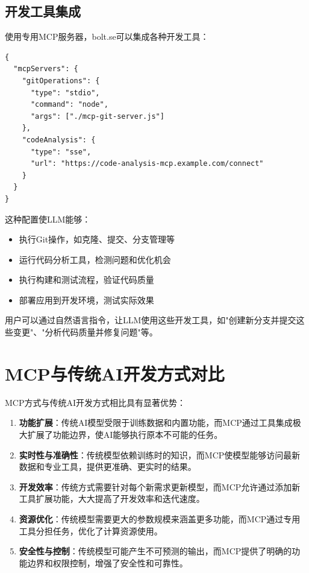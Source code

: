 \subsection{开发工具集成}

使用专用MCP服务器，bolt.se可以集成各种开发工具：

\begin{verbatim}
{
  "mcpServers": {
    "gitOperations": {
      "type": "stdio",
      "command": "node",
      "args": ["./mcp-git-server.js"]
    },
    "codeAnalysis": {
      "type": "sse",
      "url": "https://code-analysis-mcp.example.com/connect"
    }
  }
}
\end{verbatim}

这种配置使LLM能够：
\begin{itemize}
  \item 执行Git操作，如克隆、提交、分支管理等
  \item 运行代码分析工具，检测问题和优化机会
  \item 执行构建和测试流程，验证代码质量
  \item 部署应用到开发环境，测试实际效果
\end{itemize}

用户可以通过自然语言指令，让LLM使用这些开发工具，如"创建新分支并提交这些变更"、"分析代码质量并修复问题"等。

\section{MCP与传统AI开发方式对比}

MCP方式与传统AI开发方式相比具有显著优势：

\begin{enumerate}
  \item \textbf{功能扩展}：传统AI模型受限于训练数据和内置功能，而MCP通过工具集成极大扩展了功能边界，使AI能够执行原本不可能的任务。

  \item \textbf{实时性与准确性}：传统模型依赖训练时的知识，而MCP使模型能够访问最新数据和专业工具，提供更准确、更实时的结果。

  \item \textbf{开发效率}：传统方式需要针对每个新需求更新模型，而MCP允许通过添加新工具扩展功能，大大提高了开发效率和迭代速度。

  \item \textbf{资源优化}：传统模型需要更大的参数规模来涵盖更多功能，而MCP通过专用工具分担任务，优化了计算资源使用。

  \item \textbf{安全性与控制}：传统模型可能产生不可预测的输出，而MCP提供了明确的功能边界和权限控制，增强了安全性和可靠性。
\end{enumerate}


